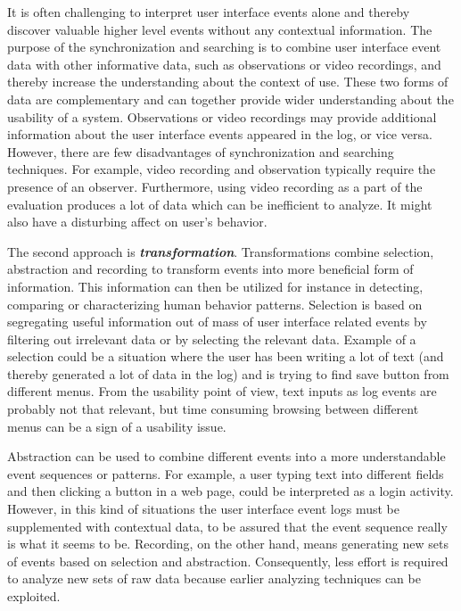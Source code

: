 \documentclass[12pt,a4paper,oneside,pdftex]{report}
\begin{document}
It is often challenging to interpret user interface events alone and thereby discover valuable higher level events without any contextual information. The purpose of the synchronization and searching is to combine user interface event data with other informative data, such as observations or video recordings, and thereby increase the understanding about the context of use. These two forms of data are complementary and can together provide wider understanding about the usability of a system. Observations or video recordings may provide additional information about the user interface events appeared in the log, or vice versa. However, there are few disadvantages of synchronization and searching techniques. For example, video recording and observation typically require the presence of an observer. Furthermore, using video recording as a part of the evaluation produces a lot of data which can be inefficient to analyze. It might also have a disturbing affect on user's behavior. \citep{RefWorks:25}

The second approach is \textbf{\emph{transformation}}. Transformations combine selection, abstraction and recording to transform events into more beneficial form of information. This information can then be utilized for instance in detecting, comparing or characterizing human behavior patterns. Selection is based on segregating useful information out of mass of user interface related events by filtering out irrelevant data or by selecting the relevant data. Example of a selection could be a situation where the user has been writing a lot of text (and thereby generated a lot of data in the log) and is trying to find save button from different menus. From the usability point of view, text inputs as log events are probably not that relevant, but time consuming browsing between different menus can be a sign of a usability issue. \citep{RefWorks:25}

Abstraction can be used to combine different events into a more understandable event sequences or patterns. For example, a user typing text into different fields and then clicking a button in a web page, could be interpreted as a login activity. However, in this kind of situations the user interface event logs must be supplemented with contextual data, to be assured that the event sequence really is what it seems to be. Recording, on the other hand, means generating new sets of events based on selection and abstraction. Consequently, less effort is required to analyze new sets of raw data because earlier analyzing techniques can be exploited. \citep{RefWorks:25}
\end{document}
